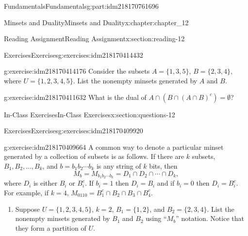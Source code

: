 \documentclass[oneside,10pt,]{book}
\numberwithin{equation}{section}
\begin{document}
\begin{partptx}{Fundamentals}{}{Fundamentals}{}{}{g:part:idm218170761696}
\begin{chapterptx}{Minsets and Duality}{}{Minsets and Duality}{}{}{x:chapter:chapter_12}
\begin{sectionptx}{Reading Assignment}{}{Reading Assignment}{}{}{x:section:reading-12}
\begin{exercises-subsection-numberless}{Exercises}{}{Exercises}{}{}{g:exercises:idm218170414432}
\par\medskip\noindent%
%
\begin{exercisegroup}
\begin{divisionexerciseeg}{1}{}{}{g:exercise:idm218170414176}%
Consider the subsets \(A = \{1, 3, 5\}\), \(B = \{2,3,4\}\),  where \(U = \{1,2,3,4,5\}\).  List the nonempty minsets generated by \(A\textrm{ and }B\).%
\end{divisionexerciseeg}%
\begin{divisionexerciseeg}{2}{}{}{g:exercise:idm218170411632}%
What is the dual of \(A \cap (B\cap (A\cap B)^c)= \emptyset\)?%
\end{divisionexerciseeg}%
\end{exercisegroup}
\par\medskip\noindent
\end{exercises-subsection-numberless}
\end{sectionptx}
%
%
\typeout{************************************************}
\typeout{************************************************}
%
\begin{sectionptx}{In-Class Exercises}{}{In-Class Exercises}{}{}{x:section:questions-12}
%
%
%
\typeout{************************************************}
\typeout{************************************************}
%
\begin{exercises-subsection-numberless}{Exercises}{}{Exercises}{}{}{g:exercises:idm218170409920}
\par\medskip\noindent%
%
\begin{exercisegroup}
\begin{divisionexerciseeg}{1}{}{}{g:exercise:idm218170409664}%
A common way to denote a particular minset generated by a collection of subsets is as follows.  If there are \(k\) subsets, \(B_1, B_2, \dots ,B_k\), and \(b=b_1b_2\cdots b_k\) is any string of \(k\) bits, then%
\begin{equation*}
M_b =  M_{b_1b_2\cdots b_k} = D_1 \cap D_2 \cap \cdots \cap D_k,
\end{equation*}
where \(D_i\) is either \(B_i\) or \(B_i^c\).  If \(b_i = 1\) then \(D_i =B_i\) and if \(b_i=0\) then \(D_i=B_i^c\).  For example, if \(k=4\), \(M_{0110} = B_1^c \cap B_2 \cap B_3 \cap B_4^c\).%
\begin{enumerate}[label=(\alph*)]
\item{}Suppose \(U=\{1, 2, 3, 4, 5\}\), \(k=2\), \(B_1= \{1, 2\}\), and \(B_2 = \{2,3,4\}\).  List the nonempty minsets generated by \(B_1\) and \(B_2\) using ``\(M_b\)'' notation. Notice that they form a partition of \(U\).%

\end{enumerate}
\end{divisionexerciseeg}
\end{exercisegroup}
\end{exercises-subsection-numberless}
\end{sectionptx}
\end{chapterptx}
\end{partptx}
\end{document}
